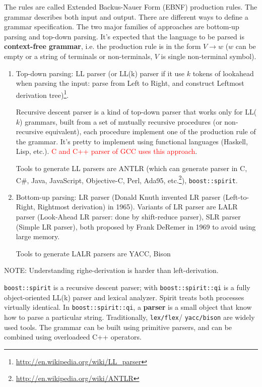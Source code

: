 The rules are called Extended Backus-Nauer Form (EBNF) production rules. The
grammar describes both input and output. There are different ways to define a
grammar specification. The two major families of approaches are bottom-up
parsing and top-down parsing. It's expected that the language to be parsed is
{\bf context-free grammar}, i.e. the production rule is in the form
$V\rightarrow w$ ($w$ can be empty or a string of terminals or non-terminals,
$V$ is single non-terminal symbol).
\begin{enumerate}
  \item Top-down parsing: LL parser (or LL(k) parser if it use $k$ tokens of
  lookahead when parsing the input: parse from Left to Right, and construct
  Leftmost derivation
  tree)\footnote{\url{http://en.wikipedia.org/wiki/LL_parser}}. 
  
  Recursive descent parser is a kind of top-down parser that works only for
  LL($k$) grammars, built from a set of mutually recursive procedures (or
  non-recursive equivalent), each procedure implement one of the production rule
  of the grammar. It's pretty to implement using functional languages (Haskell,
  Lisp, etc.). \textcolor{red}{C and C++ parser of GCC uses this approach}.
  
  Tools to generate LL parsers are ANTLR (which can generate parser in C,
  C\#, Java, JavaScript, Objective-C, Perl, Ada95,
  etc.\footnote{\url{http://en.wikipedia.org/wiki/ANTLR}}),
  \verb!boost::spirit!.

  \item Bottom-up parsing: LR parser
  (Donald Knuth invented LR parser (Left-to-Right, Rightmost derivation) in
  1965). Variants of LR parser are LALR parser (Look-Ahead LR parser: done by
  shift-reduce parser), SLR parser (Simple LR parser), both proposed by Frank
  DeRemer in 1969 to avoid using large memory.
  
  Tools to generate LALR parsers are YACC, Bison
\end{enumerate}
NOTE: Understanding righe-derivation is harder than left-derivation. 

\verb!boost::spirit! is a recursive descent parser; with
\verb!boost::spirit::qi! is a fully object-oriented LL(k) parser and
lexical analyzer. Spirit treats both processes virtually identical. In
\verb!boost::spirit::qi!, a {\bf parser} is a small object that know how to
parse a particular string.  Traditionally, \verb!lex/flex!/ \verb!yacc/bison!
are widely used tools. The grammar can be built using primitive parsers, and
can be combined using overloadeed C++ operators. 

